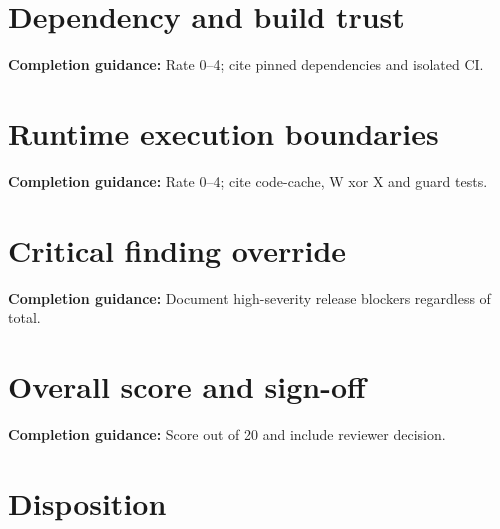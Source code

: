 \documentclass[10pt,letterpaper]{article}
\begin{document}
\section{Dependency and build trust}
\textbf{Completion guidance:} Rate 0--4; cite pinned dependencies and isolated CI.\par\medskip{}
\section{Runtime execution boundaries}
\textbf{Completion guidance:} Rate 0--4; cite code-cache, W xor X and guard tests.\par\medskip{}
\section{Critical finding override}
\textbf{Completion guidance:} Document high-severity release blockers regardless of total.\par\medskip{}
\section{Overall score and sign-off}
\textbf{Completion guidance:} Score out of 20 and include reviewer decision.\par\medskip{}
\section{Disposition}
\end{document}
